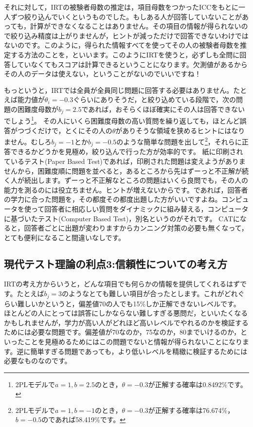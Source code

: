 \documentclass{ltjsbook}
\begin{document}
それに対して，IRTの被験者母数の推定は，項目母数をつかったICCをもとに一人ずつ絞り込んでいくというものでした。もしある人が回答していないことがあっても，計算ができなくなることはありません。その項目の情報が得られないので絞り込み精度は上がりませんが，ヒントが減っただけで回答できないわけではないのです。このように，得られた情報すべてを使ってその人の被験者母数を推定する方法のことを，といいます。このようにIRTを使うと，必ずしも全問に回答していなくてもスコアは計算できるということになります。欠測値があるからその人のデータは使えない，ということがないのでいいですね！

もっというと，IRTでは全員が全員同じ問題に回答する必要はありません。たとえば能力値が$\theta_i = -0.3$ぐらいにありそうだ，と絞り込めている段階で，次の問題の困難度母数が$b_j = 2.5$であれば，おそらくほぼ確実にその人は回答できないでしょう\footnote{2PLモデルで$a=1,b=2.5$のとき，$\theta=-0.3$が正解する確率は0.8492\%です。}。
その人にいくら困難度母数の高い質問を繰り返しても，ほとんど誤答がつづくだけで，とくにその人の$\theta$がありそうな領域を狭めるヒントにはなりません。むしろ$b_j=-1$とか$b_j=-0.5$のような簡単な問題を出して\footnote{2PLモデルで$a=1,b=-1$のとき，$\theta=-0.3$が正解する確率は76.674\%，$b=-0.5$のであれば58.419\%です。}，それらに正答できるかどうかを見極め，絞り込んで行った方が効率的です。
紙に印刷されているテスト(Paper Based Test)であれば，印刷された問題は変えようがありませんから，困難度順に問題を並べると，あるところから先はずーっと不正解が続く人が続出します。ずーっと不正解なところの問題はいくら良問でも，その人の能力を測るのには役立ちません。ヒントが増えないからです。であれば，回答者の学力に合った問題を，その都度その都度出題した方がいいですよね。コンピュータを使って回答者に相応しい質問をダイナミックに組み替える，コンピュータに基づいたテスト(Computer Based Test)，別名というのがそれです。
CATになると，回答者ごとに出題が変わりますからカンニング対策の必要も無くなって，とても便利になること間違いなしです。

\subsection{現代テスト理論の利点3:信頼性についての考え方}
IRTの考え方からいうと，どんな項目でも何らかの情報を提供してくれるはずです。たとえば$b_j=3$のようなとても難しい項目が合ったとします。これがどれぐらい難しいかというと，偏差値70の人でも15\%しか正解できないレベルです。
ほとんどの人にとっては誤答にしかならない難しすぎる悪問だ，といいたくなるかもしれませんが，学力が高い人がどれほど高いレベルでやれるのかを検証するためには必要な問題です。偏差値が70なのか，75なのか，80までいけるのか，といったことを見極めるためにはこの問題でないと情報が得られないことになります。逆に簡単すぎる問題であっても，より低いレベルを精緻に検証するためには必要なものなのです。
\end{document}
